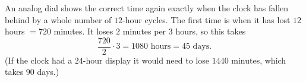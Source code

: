 An analog dial shows the correct time again exactly when the clock has fallen behind by a whole number of $12$-hour cycles. The first time is when it has lost $12$ hours $=720$ minutes. It loses $2$ minutes per $3$ hours, so this takes
\[
\dfrac{720}{2}\cdot3=1080\text{ hours}=\boxed{45\text{ days}}.
\]
(If the clock had a $24$-hour display it would need to lose $1440$ minutes, which takes $90$ days.)
